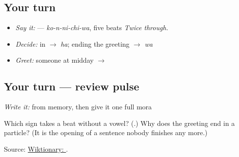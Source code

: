\subsection*{Your turn}
\begin{itemize}
\raggedright
  \item \emph{Say it:} \textbf{} — \emph{ko-n-ni-chi-wa}, five beats \emph{Twice through.}
  \item \emph{Decide:} \textbf{} in \textbf{} $\to$ \emph{ha}; \textbf{} ending the greeting $\to$ \emph{wa}
  \item \emph{Greet:} someone at midday $\to$ \textbf{}
\end{itemize}

\subsection*{Your turn — review pulse}
\emph{Write it:} \textbf{} from memory, then give it one full mora

\begin{tcolorbox}[breakable,colback=teal!4,colframe=teal!35!black,title={Before you move on}]
Which sign takes a beat without a vowel? (\textbf{}.) Why does the greeting end in a particle? (It is the opening of a sentence nobody finishes any more.)

Source: \href{https://en.wiktionary.org/wiki/\%E4\%BB\%8A\%E6\%97\%A5\%E3\%81\%AF}{Wiktionary: }.
\end{tcolorbox}

